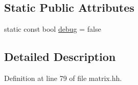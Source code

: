 \subsection*{Static Public Attributes}
\begin{DoxyCompactItemize}
\item 
static const bool \hyperlink{class_rfold_1_1_matrix_ad9a9131f0d234138b757dbe76fe62b28}{debug} = false
\end{DoxyCompactItemize}


\subsection{Detailed Description}


Definition at line 79 of file matrix.\+hh.



